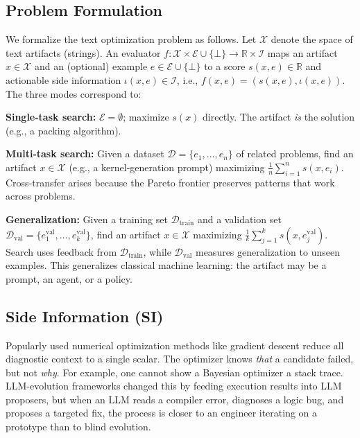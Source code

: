 \documentclass[sigconf]{acmart}
\newcommand{\asi}{SI}
\begin{document}
\subsection{Problem Formulation}\label{sec:formulation}

    We formalize the text optimization problem as follows. Let $\mathcal{X}$ denote the space of text artifacts (strings). An evaluator $f:\mathcal{X}\times\mathcal{E} \cup \{\bot\} \to \mathbb{R}\times\mathcal{I}$ maps an artifact $x\in\mathcal{X}$ and an (optional) example $e\in\mathcal{E} \cup \{\bot\} $ to a score $s(x,e)\in\mathbb{R}$ and actionable side information $\iota(x,e)\in\mathcal{I}$, i.e., $f(x,e)=(s(x,e),\iota(x,e))$. The three modes correspond to:

\textbf{Single-task search:} $\mathcal{E}=\emptyset$; maximize $s(x)$ directly. The artifact \emph{is} the solution (e.g., a packing algorithm).

\textbf{Multi-task search:} Given a dataset $\mathcal{D}=\{e_1,\ldots,e_n\}$ of related problems, find an artifact $x\in\mathcal{X}$ (e.g., a kernel-generation prompt) maximizing $\frac{1}{n}\sum_{i=1}^{n} s(x,e_i)$. Cross-transfer arises because the Pareto frontier preserves patterns that work across problems.

\textbf{Generalization:} Given a training set $\mathcal{D}_{\text{train}}$ and a validation set $\mathcal{D}_{\text{val}}=\{e^{\text{val}}_1,\ldots,e^{\text{val}}_k\}$, find an artifact $x\in\mathcal{X}$ maximizing $\frac{1}{k}\sum_{j=1}^{k} s\!\left(x,e^{\text{val}}_j\right)$. Search uses feedback from $\mathcal{D}_{\text{train}}$, while $\mathcal{D}_{\text{val}}$ measures generalization to unseen examples. This generalizes classical machine learning: the artifact may be a prompt, an agent, or a policy.

\subsection{Side Information (\asi{})}\label{sec:asi}

Popularly used numerical optimization methods like gradient descent reduce all diagnostic context to a single scalar. The optimizer knows \emph{that} a candidate failed, but not \emph{why}. For example, one cannot show a Bayesian optimizer a stack trace. LLM-evolution frameworks changed this by feeding execution results into LLM proposers, but when an LLM reads a compiler error, diagnoses a logic bug, and proposes a targeted fix, the process is closer to an engineer iterating on a prototype than to blind evolution.
\end{document}
